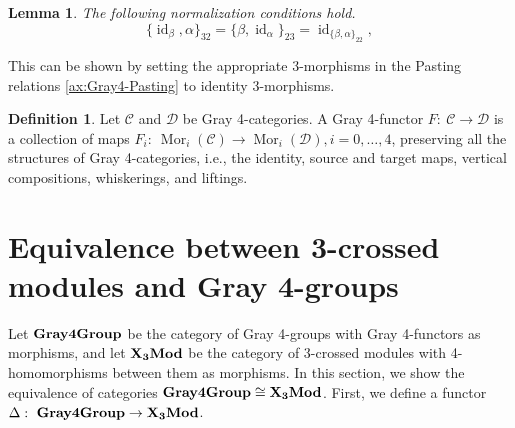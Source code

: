 \documentclass[11pt, reqno]{amsart} %
\newcommand{\mor}{{\mathop{\mathrm{Mor}}}}
\newcommand{\id}{{\mathop{\mathrm{id}}}}
\newcommand{\TXMod}{{\bf X_3Mod}}
\newcommand{\Gray}{{\bf Gray4Group}}
\newcommand{\cC}{{\mathcal{C}}}
\newcommand{\cD}{{\mathcal{D}}}
\newtheorem{lemma}[theorem]{Lemma}
\theoremstyle{definition}
\newtheorem{definition}[theorem]{Definition}
\theoremstyle{remark}
\numberwithin{equation}{section}
\begin{document}
\begin{lemma}
The following normalization conditions hold.
\[
  \{\id_\beta,\alpha\}_{32} = \{\beta,\id_\alpha\}_{23} = \id_{\{\beta,\alpha\}_{22}},
\]
\end{lemma}
This can be shown by setting the appropriate 3-morphisms in the Pasting relations \ref{ax:Gray4-Pasting} to identity 3-morphisms.

\begin{definition}\label{def:Gray4Functor}
Let $\cC$ and $\cD$ be Gray 4-categories. A Gray 4-functor $F:~\cC\to\cD$ is a collection of maps $F_i:~\mor_i(\cC)\to\mor_i(\cD), i=0,\ldots,4$, preserving all the structures of Gray 4-categories, i.e., the identity, source and target maps, vertical compositions, whiskerings, and liftings.
\end{definition}


\section{Equivalence between 3-crossed modules and Gray 4-groups}\label{sec:main}
Let $\Gray$ be the category of Gray 4-groups with Gray 4-functors as morphisms, and let $\TXMod$ be the category of 3-crossed modules with 4-homomorphisms between them as morphisms. In this section, we show the equivalence of categories $\Gray \cong \TXMod$. First, we define a functor $\Delta:~\Gray\to \TXMod$.
\end{document}
